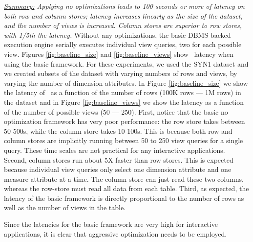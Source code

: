{\em \underline{Summary:} Applying no optimizations 
leads to 100 seconds or more of latency on both row and column stores;
latency increases linearly as the size of the dataset, and the number
of views is increased. Column stores are superior to row stores,
with 1/5th the latency.}
Without any optimizations, the basic DBMS-backed execution engine
serially executes individual view queries, two for each possible view.
Figures \ref{fig:baseline_size} and \ref{fig:baseline_views} show
\VizRecDB\ latency when using the basic framework.
For these experiments, we used the SYN1 dataset and we created subsets of the dataset with
varying numbers of rows and views, by varying the number of dimension attributes. 
In Figure \ref{fig:baseline_size} we show the latency of \VizRecDB\ as a function
of the number of rows (100K rows --- 1M rows) in the dataset and in 
Figure \ref{fig:baseline_views} we show the latency as a function 
of the number of possible views (50 --- 250).
First, notice that the basic no optimization framework has very 
poor performance: the row store takes between 50-500s, 
while the column store takes 10-100s. 
This is because both row and column stores are implicitly
running between 50 to 250 view queries for a single \VizRecDB query.
These time scales are not practical for
any interactive applications. 
Second, column stores run about 5X faster than row stores. 
This is expected because individual view queries only select one dimension
attribute and one measure attribute at a time.  
The column store can just read these two
columns, whereas the row-store must read all data from each table.
Third, as expected, the latency of the
basic framework is directly proportional to the number of rows as well as the 
number of views in the table.

Since the latencies for the basic framework are very high for interactive
applications, it is clear that aggressive optimization needs to be employed. 


